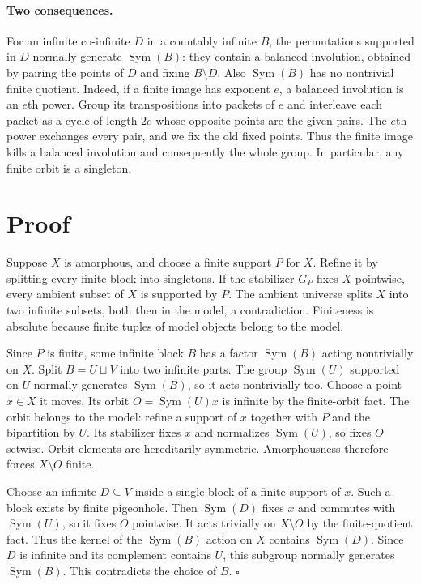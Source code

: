 \documentclass[11pt]{article}
\begin{document}
\paragraph{Two consequences.} For an infinite co-infinite $D$ in a countably infinite $B$, the permutations supported in $D$ normally generate $\operatorname{Sym}(B)$: they contain a balanced involution, obtained by pairing the points of $D$ and fixing $B\setminus D$. Also $\operatorname{Sym}(B)$ has no nontrivial finite quotient. Indeed, if a finite image has exponent $e$, a balanced involution is an $e$th power. Group its transpositions into packets of $e$ and interleave each packet as a cycle of length $2e$ whose opposite points are the given pairs. The $e$th power exchanges every pair, and we fix the old fixed points. Thus the finite image kills a balanced involution and consequently the whole group. In particular, any finite orbit is a singleton.

\section*{Proof}
Suppose $X$ is amorphous, and choose a finite support $P$ for $X$. Refine it by splitting every finite block into singletons. If the stabilizer $G_P$ fixes $X$ pointwise, every ambient subset of $X$ is supported by $P$. The ambient universe splits $X$ into two infinite subsets, both then in the model, a contradiction. Finiteness is absolute because finite tuples of model objects belong to the model.

Since $P$ is finite, some infinite block $B$ has a factor $\operatorname{Sym}(B)$ acting nontrivially on $X$. Split $B=U\sqcup V$ into two infinite parts. The group $\operatorname{Sym}(U)$ supported on $U$ normally generates $\operatorname{Sym}(B)$, so it acts nontrivially too. Choose a point $x\in X$ it moves. Its orbit $O=\operatorname{Sym}(U)x$ is infinite by the finite-orbit fact. The orbit belongs to the model: refine a support of $x$ together with $P$ and the bipartition by $U$. Its stabilizer fixes $x$ and normalizes $\operatorname{Sym}(U)$, so fixes $O$ setwise. Orbit elements are hereditarily symmetric. Amorphousness therefore forces $X\setminus O$ finite.

Choose an infinite $D\subseteq V$ inside a single block of a finite support of $x$. Such a block exists by finite pigeonhole. Then $\operatorname{Sym}(D)$ fixes $x$ and commutes with $\operatorname{Sym}(U)$, so it fixes $O$ pointwise. It acts trivially on $X\setminus O$ by the finite-quotient fact. Thus the kernel of the $\operatorname{Sym}(B)$ action on $X$ contains $\operatorname{Sym}(D)$. Since $D$ is infinite and its complement contains $U$, this subgroup normally generates $\operatorname{Sym}(B)$. This contradicts the choice of $B$. \hfill$\square$
\end{document}

